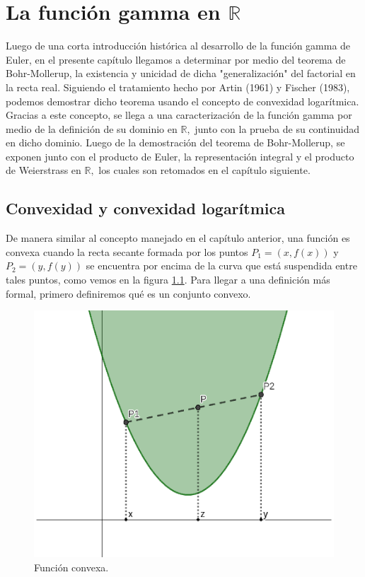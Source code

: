 %
\chapter{La función gamma en $\mathbb{R}$}
Luego de una corta introducción histórica al desarrollo de la función gamma de Euler, en el presente capítulo llegamos a determinar por medio del teorema de Bohr-Mollerup, la existencia y unicidad de dicha "generalización" del factorial en la recta real. Siguiendo el tratamiento hecho por Artin (1961) y Fischer (1983), podemos demostrar dicho teorema usando el concepto de convexidad logarítmica. Gracias a este concepto, se llega a una caracterización de la función gamma por medio de la definición de su dominio en $\mathbb{R},$ junto con la prueba de su continuidad en dicho dominio. Luego de la demostración del teorema de Bohr-Mollerup, se exponen junto con el producto de Euler, la representación integral y el producto de Weierstrass en $\mathbb{R},$ los cuales son retomados en el capítulo siguiente. 

\section{Convexidad y convexidad logarítmica}
De manera similar al concepto manejado en el capítulo anterior, una función es convexa cuando la recta secante formada por los puntos $P_1 = (x,f(x))$ y $P_2 = (y,f(y))$ se encuentra por encima de la curva que está suspendida entre tales puntos, como vemos en la figura \ref{fig2_1}. Para llegar a una definición más formal, primero definiremos qué es un conjunto convexo.

\begin{figure}[htbp]
	\begin{center}
		\includegraphics[scale=0.5]{convexo.eps}
	\end{center}
	\caption{Función convexa.}
	\label{fig2_1}
\end{figure}

